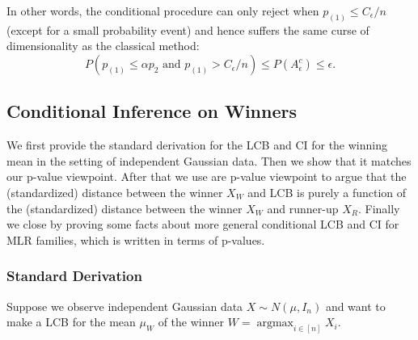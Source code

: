 \documentclass{article}
\DeclareMathOperator*{\argmax}{argmax}
\begin{document}
\begin{appendix}
In other words, the conditional procedure can only reject when $p_{(1)} \leq C_{\epsilon}/n$ (except for a small probability event) and hence suffers the same curse of dimensionality as the classical method:
\begin{equation*}
    P(p_{(1)} \leq \alpha p_{2} \text{ and } p_{(1)} > C_{\epsilon}/n) \leq P(A_{\epsilon}^c) \leq \epsilon.  
\end{equation*}


\subsection{Conditional Inference on Winners}
\label{sec:cond_appdx}

We first provide the standard derivation for the LCB and CI for the winning mean in the setting of independent Gaussian data. Then we show that it matches our p-value viewpoint. After that we use are p-value viewpoint to argue that the (standardized) distance between the winner $X_W$ and LCB is purely a function of the (standardized) distance between the winner $X_W$ and runner-up $X_R$. Finally we close by proving some facts about more general conditional LCB and CI for MLR families, which is written in terms of p-values. 

\subsubsection{Standard Derivation}

Suppose we observe independent Gaussian data $X \sim N(\mu, I_n)$ and want to make a LCB for the mean $\mu_W$ of the winner $W = \argmax_{i \in [n]} X_i$. 


\end{appendix}
\end{document}
